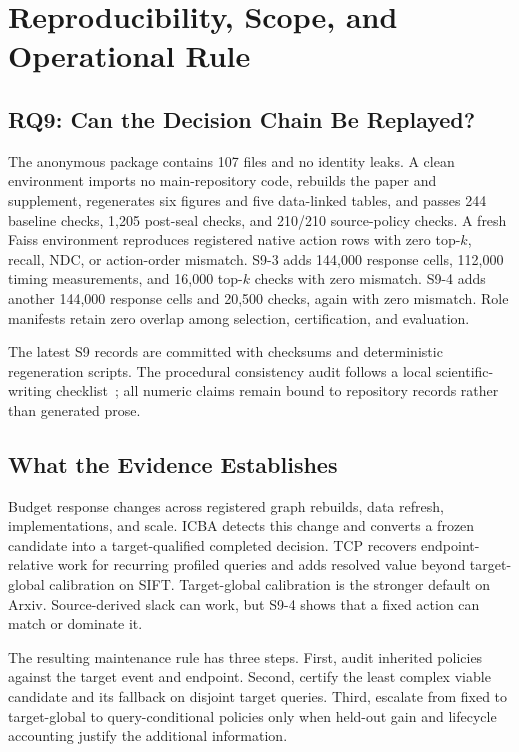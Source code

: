 \section{Reproducibility, Scope, and Operational Rule}
\label{sec:discussion}

\subsection{RQ9: Can the Decision Chain Be Replayed?}
The anonymous package contains 107 files and no identity leaks. A clean environment imports no main-repository code, rebuilds the paper and supplement, regenerates six figures and five data-linked tables, and passes 244 baseline checks, 1,205 post-seal checks, and 210/210 source-policy checks. A fresh Faiss environment reproduces registered native action rows with zero top-$k$, recall, NDC, or action-order mismatch. S9-3 adds 144,000 response cells, 112,000 timing measurements, and 16,000 top-$k$ checks with zero mismatch. S9-4 adds another 144,000 response cells and 20,500 checks, again with zero mismatch. Role manifests retain zero overlap among selection, certification, and evaluation.

The latest S9 records are committed with checksums and deterministic regeneration scripts. The procedural consistency audit follows a local scientific-writing checklist~\cite{kassis2026scientific}; all numeric claims remain bound to repository records rather than generated prose.

\subsection{What the Evidence Establishes}
Budget response changes across registered graph rebuilds, data refresh, implementations, and scale. ICBA detects this change and converts a frozen candidate into a target-qualified completed decision. TCP recovers endpoint-relative work for recurring profiled queries and adds resolved value beyond target-global calibration on SIFT. Target-global calibration is the stronger default on Arxiv. Source-derived slack can work, but S9-4 shows that a fixed action can match or dominate it.

The resulting maintenance rule has three steps. First, audit inherited policies against the target event and endpoint. Second, certify the least complex viable candidate and its fallback on disjoint target queries. Third, escalate from fixed to target-global to query-conditional policies only when held-out gain and lifecycle accounting justify the additional information.

